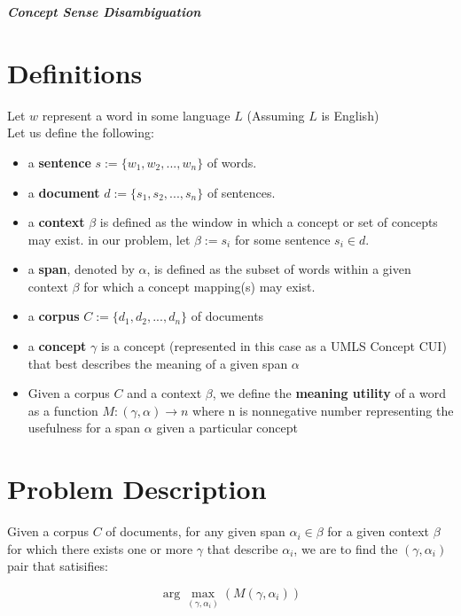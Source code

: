 \documentclass[12pt, letterpaper]{article}
\begin{document}
\begin{center}
\textit{\textbf{Concept Sense Disambiguation}}
\end{center}

\section{Definitions}
Let $w$ represent a word in some language $L$ (Assuming $L$ is English)\\
Let us define the following:\\
\begin{itemize}
\item{a \textbf{sentence} $s := \{w_1,w_2,...,w_n\}$} of words.
\item{a \textbf{document} $d := \{s_1,s_2,...,s_n\}$} of sentences.
\item{a \textbf{context} $\beta$ is defined as the window in which a concept or set of concepts may exist. in our problem, let $\beta := s_i$ for some sentence $s_i \in d$.}
\item{a \textbf{span}, denoted by $\alpha$, is defined as the subset of words within a given context $\beta$ for which a concept mapping(s) may exist.}
\item{a \textbf{corpus} $C := \{d_1,d_2,...,d_n\}$ of documents}
\item{a \textbf{concept} $\gamma$ is a concept (represented in this case as a UMLS Concept CUI) that best describes the meaning of a given span $\alpha$}
\item{Given a corpus $C$ and a context $\beta$, we define the \textbf{meaning utility} of a word as a function $M: (\gamma,\alpha) \rightarrow n$ where n is nonnegative number representing the usefulness for a span $\alpha$ given a particular concept}
\end{itemize}

\section{Problem Description}
Given a corpus $C$ of documents, for any given span $\alpha_i \in \beta$ for a given context $\beta$ for which there exists one or more $\gamma$ that describe $\alpha_i$, we are to find the $(\gamma,\alpha_i)$ pair that satisifies:\\[1mm]
\begin{center}
\begin{equation}
\arg\max_{(\gamma, \alpha_i)}(M(\gamma,\alpha_i))
\end{equation}
\end{center}
\end{document}
